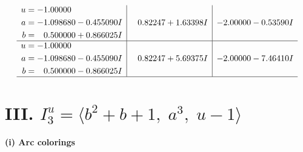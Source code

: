\documentclass[1p]{elsarticle_modified}
\theoremstyle{definition}
\begin{document}
$$\begin{array}{c|c|c}
\begin{aligned}
u &= -1.00000\phantom{ +0.000000I} \\
a &= -1.098680 - 0.455090 I \\
b &= \phantom{-}0.500000 + 0.866025 I\end{aligned}
 & \phantom{-}0.82247 + 1.63398 I & -2.00000 - 0.53590 I \\ \hline\begin{aligned}
u &= -1.00000\phantom{ +0.000000I} \\
a &= -1.098680 - 0.455090 I \\
b &= \phantom{-}0.500000 - 0.866025 I\end{aligned}
 & \phantom{-}0.82247 + 5.69375 I & -2.00000 - 7.46410 I\\
 \hline 
 \end{array}$$\newpage\newpage\renewcommand{\arraystretch}{1}
\centering \section*{III. $I^u_{3}= \langle b^2+b+1,\;a^3,\;u-1 \rangle$}
\flushleft \textbf{(i) Arc colorings}\\
\end{document}
